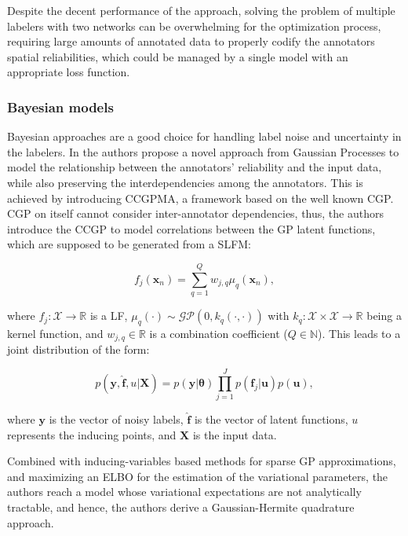 Despite the decent performance of the approach, solving the problem
of multiple labelers with two networks can be overwhelming for the
optimization process, requiring large amounts of annotated data to
properly codify the annotators spatial reliabilities, which could be
managed by a single model with an appropriate loss function.
\subsubsection{Bayesian models}

Bayesian approaches are a good choice for handling label noise
and uncertainty in the labelers. In \cite{GilEtAlvarez2023CCGPMA} the
authors propose a novel approach from Gaussian Processes to model the
relationship between the annotators' reliability and the input data,
while also preserving the interdependencies among the annotators.
This is achieved by introducing \gls{CCGPMA}, a framework based on
the well known \gls{CGP}.
\gls{CGP} on itself cannot consider inter-annotator dependencies,
thus, the authors introduce the \gls{CCGP} to model correlations
between the GP latent functions, which are supposed to be generated
from a \gls{SLFM}:

\begin{equation}
  f_j(\mathbf{x}_n) = \sum_{q=1}^{Q} w_{j,q} \mu_q(\mathbf{x}_n),
\end{equation}

where $f_j : \mathcal{X} \to \mathbb{R}$ is a \gls{LF}, $\mu_q(\cdot) \sim
\mathcal{GP}(0, k_q(\cdot, \cdot))$ with $k_q : \mathcal{X} \times
\mathcal{X} \to \mathbb{R}$ being a kernel function, and $w_{j,q} \in
\mathbb{R}$ is a combination coefficient ($Q \in \mathbb{N}$). This leads
to a joint distribution of the form:

\begin{equation}
  p(\mathbf{y}, \hat{\mathbf{f}}, u | \mathbf{X}) = p(\mathbf{y} |
  \boldsymbol{\theta}) \prod_{j=1}^{J} p(\mathbf{f}_j | \mathbf{u})
  p(\mathbf{u}),
\end{equation}

where $\mathbf{y}$ is the vector of noisy labels, $\hat{\mathbf{f}}$
is the vector of latent functions, $u$ represents the inducing points,
and $\mathbf{X}$ is the input data.

Combined with inducing-variables based methods for sparse GP
approximations, and maximizing an \gls{ELBO} for the estimation of the
variational parameters, the authors reach a model whose variational
expectations are not analytically tractable, and hence, the authors
derive a Gaussian-Hermite quadrature approach.

